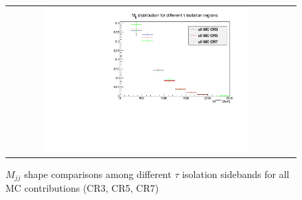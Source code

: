 \begin{figure}[tbh!]
	\centering
	\begin{tabular}{cc}
		\includegraphics[width=0.75\textwidth]{PLOTS/diTauHadLSotherPlots/LS_mjjshapestab_vs_tauiso_mc.pdf}
	\end{tabular}
	\caption{$M_{jj}$ shape comparisons among different $\tau$ isolation sidebands for all MC contributions (CR3, CR5, CR7)}
	\label{fig:LS_mjjshapestab_vs_tauiso_mc}
\end{figure}

